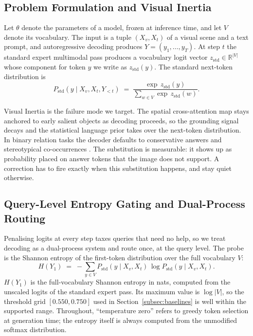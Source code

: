 \documentclass{ieeeaccess}
\begin{document}
\subsection{Problem Formulation and Visual Inertia}\label{subsec:problem}

Let $\theta$ denote the parameters of a model, frozen at inference time, and let $V$ denote its vocabulary. The input is a tuple $(X_{v}, X_{t})$ of a visual scene and a text prompt, and autoregressive decoding produces $Y = (y_{1}, \ldots, y_{T})$. At step $t$ the standard expert multimodal pass produces a vocabulary logit vector $z_{\text{std}} \in \mathbb{R}^{|V|}$ whose component for token $y$ we write as $z_{\text{std}}(y)$. The standard next-token distribution is
\begin{equation}\label{eq:std}
P_{\text{std}}(y \mid X_{v}, X_{t}, Y_{<t}) \;=\; \frac{\exp\, z_{\text{std}}(y)}{\sum_{w \in V} \exp\, z_{\text{std}}(w)}.
\end{equation}

Visual Inertia \cite{gong2026attention} is the failure mode we target. The spatial cross-attention map stays anchored to early salient objects as decoding proceeds, so the grounding signal decays and the statistical language prior takes over the next-token distribution. In binary relation tasks the decoder defaults to conservative answers and stereotypical co-occurrences \cite{yin2025mirage}. The substitution is measurable: it shows up as probability placed on answer tokens that the image does not support. A correction has to fire exactly when this substitution happens, and stay quiet otherwise.

\subsection{Query-Level Entropy Gating and Dual-Process Routing}\label{subsec:gate}

Penalising logits at every step taxes queries that need no help, so we treat decoding as a dual-process system \cite{kahneman2011thinking} and route once, at the query level. The probe is the Shannon entropy \cite{shannon1948mathematical} of the first-token distribution over the full vocabulary $V$:
\begin{equation}\label{eq:entropy}
H(Y_{1}) \;=\; -\sum_{y \in V} P_{\text{std}}(y \mid X_{v}, X_{t})\, \log P_{\text{std}}(y \mid X_{v}, X_{t}).
\end{equation}
$H(Y_{1})$ is the full-vocabulary Shannon entropy in nats, computed from the unscaled logits of the standard expert pass. Its maximum value is $\log |V|$, so the threshold grid $[0.550, 0.750]$ used in Section~\ref{subsec:baselines} is well within the supported range. Throughout, ``temperature zero'' refers to greedy token selection at generation time; the entropy itself is always computed from the unmodified softmax distribution.
\end{document}
